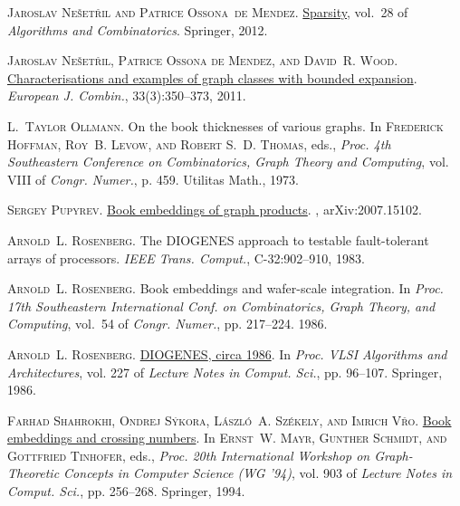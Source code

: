 \documentclass[kpfonts]{patmorin}
\begin{document}
	\textsc{Jaroslav Ne{\v{s}}et{\v{r}}il and Patrice Ossona~de Mendez}.
	\newblock \href{https://doi.org/10.1007/978-3-642-27875-4}{Sparsity}, vol.~28
	of \emph{Algorithms and Combinatorics}.
	\newblock Springer, 2012.
	
	\textsc{Jaroslav Ne{\v{s}}et{\v{r}}il, Patrice {Ossona de Mendez}, and David~R.
		Wood}.
	\newblock \href{https://doi.org/10.1016/j.ejc.2011.09.008}{Characterisations
		and examples of graph classes with bounded expansion}.
	\newblock \emph{European J. Combin.}, 33(3):350--373, 2011.
	
	\textsc{L.~Taylor Ollmann}.
	\newblock On the book thicknesses of various graphs.
	\newblock In \textsc{Frederick Hoffman, Roy~B. Levow, and Robert S.~D. Thomas},
	eds., \emph{Proc. 4th {S}outheastern {C}onference on {C}ombinatorics, {G}raph
		{T}heory and {C}omputing}, vol. VIII of \emph{Congr. Numer.}, p. 459.
	Utilitas Math., 1973.
	
	\textsc{Sergey Pupyrev}.
	\newblock \href{http://arxiv.org/abs/2007.15102}{Book embeddings of graph
		products}.
	, arXiv:2007.15102.
	
	\textsc{Arnold~L. Rosenberg}.
	\newblock The {DIOGENES} approach to testable fault-tolerant arrays of
	processors.
	\newblock \emph{IEEE Trans. Comput.}, C-32:902--910, 1983.
	
	\textsc{Arnold~L. Rosenberg}.
	\newblock Book embeddings and wafer-scale integration.
	\newblock In \emph{Proc. 17th Southeastern International Conf. on
		Combinatorics, Graph Theory, and Computing}, vol.~54 of \emph{Congr. Numer.},
	pp. 217--224. 1986{}.
	
	\textsc{Arnold~L. Rosenberg}.
	\newblock \href{https://doi.org/10.1007/3-540-16766-8_9}{{DIOGENES}, circa
		1986}.
	\newblock In \emph{Proc. {VLSI} Algorithms and Architectures}, vol. 227 of
	\emph{Lecture Notes in Comput. Sci.}, pp. 96--107. Springer,
	1986{}.
	
	\textsc{Farhad Shahrokhi, Ondrej S{\'y}kora, L{\'a}szl{\'o}~A. Sz{\'e}kely, and
		Imrich V{\v{r}}{}o}.
	\newblock \href{https://doi.org/10.1007/3-540-59071-4\_53}{Book embeddings and
		crossing numbers}.
	\newblock In \textsc{Ernst~W. Mayr, Gunther Schmidt, and Gottfried Tinhofer},
	eds., \emph{Proc. 20th International Workshop on Graph-Theoretic Concepts in
		Computer Science (WG '94)}, vol. 903 of \emph{Lecture Notes in Comput. Sci.},
	pp. 256--268. Springer, 1994.
	
\end{document}
